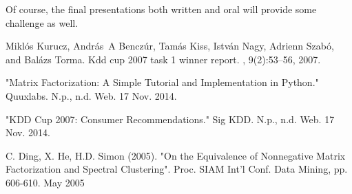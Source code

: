 \documentclass[11pt]{article}
\begin{document}
Of course, the final presentations both written and oral
will provide some challenge as well.


\begin{thebibliography}{}

Mikl{\'o}s Kurucz, Andr{\'a}s~A Bencz{\'u}r, Tam{\'a}s Kiss, Istv{\'a}n Nagy,
  Adrienn Szab{\'o}, and Bal{\'a}zs Torma.
\newblock Kdd cup 2007 task 1 winner report.
, 9(2):53--56, 2007.

"Matrix Factorization: A Simple Tutorial and Implementation in Python." Quuxlabs. N.p., n.d. Web. 17 Nov. 2014.

"KDD Cup 2007: Consumer Recommendations." Sig KDD. N.p., n.d. Web. 17 Nov. 2014.

C. Ding, X. He, H.D. Simon (2005). "On the Equivalence of Nonnegative Matrix Factorization and Spectral Clustering". Proc. SIAM Int'l Conf. Data Mining, pp. 606-610. May 2005



\end{thebibliography}
  
\end{document}
